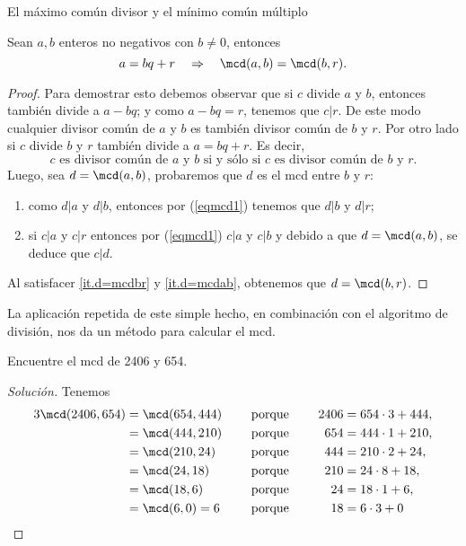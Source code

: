 \begin{section}{El máximo común divisor y el mínimo común
múltiplo}
\begin{proposicion}\label{prop-alg-eucl} Sean  $a,b$ enteros no negativos con $b \not=0$, entonces 
    \begin{equation}\label{bec}
    a=bq+r\quad \Rightarrow \quad\mcd(a,b)=\mcd(b,r).
    \end{equation}
\end{proposicion}
\begin{proof}
    Para demostrar esto debemos observar que si $c$ divide $a$ y $b$, entonces también divide a $a-bq$; y como $a-bq=r$, tenemos que $c|r$. De este modo cualquier divisor común de $a$ y $b$ es también divisor común de $b$ y $r$.  Por otro lado si $c$ divide $b$ y $r$ también divide a $a=bq+r$. Es decir, 
    \begin{equation}\label{eqmcd1}
    \text{$c$ es divisor común de $a$ y $b$ si y sólo si $c$ es divisor común de $b$ y $r$.} \tag{*}
    \end{equation}
    Luego, sea $d = \mcd(a,b)$, probaremos que $d$ es el mcd entre $b$ y $r$:
    \begin{enumerate}[label=\textit{\alph*)}]
        \item\label{it.d=mcdbr} como $d|a$ y $d|b$, entonces por (\ref{eqmcd1}) tenemos que $ d|b$ y $d|r$;
        \item\label{it.d=mcdab} si $c|a $ y $c|r$ entonces por (\ref{eqmcd1})  $c|a$ y $c|b$ y debido a que $d = \mcd(a,b)$, se deduce que $c|d$.
    \end{enumerate}
    Al satisfacer \ref{it.d=mcdbr} y \ref{it.d=mcdab}, obtenemos que $d = \mcd(b,r)$.
\end{proof}

La aplicación repetida de este simple hecho, en combinación con el algoritmo de división, nos da un método para calcular el mcd.

\begin{ejemplo*} Encuentre el mcd de 2406 y 654.
\end{ejemplo*}
\begin{proof}[Solución] Tenemos
    \begin{alignat*}3
    \mcd(2406,654)&=\mcd(654,444)&\quad &\text{ porque }\quad& 2406&=654\cdot3+444,\\
    &=\mcd(444,210)& &\text{ porque }\quad& 654&=444\cdot1+210,\\
    &=\mcd(210,24)&& \text{ porque }\quad &444&=210\cdot2+24,\\
    &=\mcd(24,18) && \text{ porque }\quad &210&=24\cdot8+18,\\
    &=\mcd(18,6)  && \text{ porque }\quad &24 &=18\cdot1+6,\\
    & =\mcd(6,0) = 6           &&\text{ porque }\quad&18&=6\cdot3 + 0
    \end{alignat*}
    

\end{proof}
\end{section}
